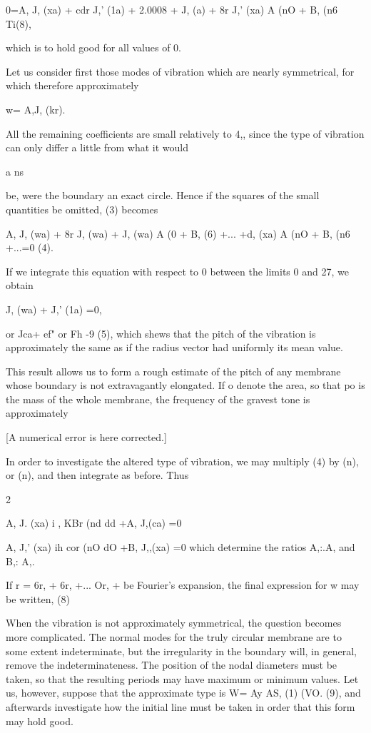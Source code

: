 0=A, J, (xa) + cdr J,' (1a) + 2.0008 + J, (a) + 8r J,' (xa) A (nO + B,
(n6 Ti(8),

which is to hold good for all values of 0.

Let us consider first those modes of vibration which are nearly
symmetrical, for which therefore approximately

w= A,J, (kr).

All the remaining coefficients are small relatively to 4,, since the
type of vibration can only differ a little from what it would

a ns

be, were the boundary an exact circle. Hence if the squares of the small
quantities be omitted, (3) becomes

A, J, (wa) + 8r J, (wa) + J, (wa) A (0 + B, (6) +... +d, (xa) A (nO + B,
(n6 +...=0 (4).

If we integrate this equation with respect to 0 between the limits 0 and
27, we obtain

J, (wa) + J,' (1a) =0,

or Jca+ ef" or Fh -9 (5),
which shews that the pitch of the vibration is approximately the same as
if the radius vector had uniformly its mean value.

This result allows us to form a rough estimate of the pitch of any
membrane whose boundary is not extravagantly elongated. If o denote the
area, so that po is the mass of the whole membrane, the frequency of the
gravest tone is approximately

[A numerical error is here corrected.]


In order to investigate the altered type of vibration, we may
multiply (4) by (n), or (n), and then integrate as before. Thus

2

A, J. (xa) i , KBr (nd dd +A, J,(ca) =0

A, J,' (xa) ih cor (nO dO +B, J,,(xa) =0
which determine the ratios A,:.A, and B,: A,.

If r = 6r, + 6r, +... Or, + be Fourier's expansion, the final
expression for w may be written, (8)

When the vibration is not approximately symmetrical, the question
becomes more complicated. The normal modes for the truly circular
membrane are to some extent indeterminate, but the
irregularity in the boundary will, in general, remove the
indeterminateness. The position of the nodal diameters must be taken, so
that the resulting periods may have maximum or minimum values. Let us,
however, suppose that the approximate type is
W= Ay AS, (1) (VO. (9),
and afterwards investigate how the initial line must be taken in order
that this form may hold good.


